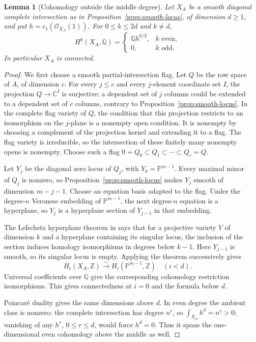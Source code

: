 \documentclass[11pt]{article}
\newcommand{\Q}{\mathbb Q}
\newcommand{\C}{\mathbb C}
\newcommand{\Z}{\mathbb Z}
\newcommand{\PP}{\mathbb P}
\theoremstyle{plain}
\newtheorem{lemma}[theorem]{Lemma}
\theoremstyle{definition}
\theoremstyle{remark}
\numberwithin{equation}{section}
\begin{document}
\begin{lemma}[Cohomology outside the middle degree]\label{lem:ambient}
Let \(X_A\) be a smooth diagonal complete intersection as in
Proposition~\ref{prop:smooth-locus}, of dimension \(d\geq1\),
and put \(h=c_1(\mathcal O_{X_A}(1))\).  For \(0\leq k\leq2d\)
and \(k\ne d\),
\[
 H^k(X_A,\Q)=
 \begin{cases}
 \Q h^{k/2},&k\text{ even},\\
 0,&k\text{ odd}.
 \end{cases}
\]
In particular \(X_A\) is connected.
\end{lemma}
\begin{proof}
We first choose a smooth partial-intersection flag.  Let \(Q\) be the
row space of \(A\), of dimension \(c\).  For every \(j\leq c\)
and every \(j\)-element coordinate set \(I\), the projection
\(Q\to\C^I\) is surjective: a dependent set of \(j\) columns
could be extended to a dependent set of \(c\) columns, contrary
to Proposition~\ref{prop:smooth-locus}.  In the complete flag
variety of \(Q\), the condition that this projection restricts
to an isomorphism on the \(j\)-plane is a nonempty open condition.
It is nonempty by choosing a complement of the projection kernel
and extending it to a flag.  The flag variety is irreducible, so
the intersection of these finitely many nonempty opens is nonempty.
Choose such a flag \(0=Q_0\subset Q_1\subset\cdots\subset Q_c=Q\).

Let \(Y_j\) be the diagonal zero locus of \(Q_j\), with
\(Y_0=\PP^{m-1}\).  Every maximal minor of \(Q_j\) is nonzero,
so Proposition~\ref{prop:smooth-locus} makes \(Y_j\) smooth of
dimension \(m-j-1\).  Choose an equation basis adapted to the
flag.  Under the degree-\(n\) Veronese embedding of \(\PP^{m-1}\),
the next degree-\(n\) equation is a hyperplane, so \(Y_j\) is a
hyperplane section of \(Y_{j-1}\) in that embedding.

The Lefschetz hyperplane theorem in
\cite[Corollary~7.3, p.~41]{Milnor} says that for a projective
variety \(V\) of dimension \(k\) and a hyperplane containing its
singular locus, the inclusion of the section induces homology
isomorphisms in degrees below \(k-1\).  Here \(Y_{j-1}\) is
smooth, so its singular locus is empty.  Applying the theorem
successively gives
\[
 H_i(X_A,\Z)\xrightarrow{\sim}H_i(\PP^{m-1},\Z)\quad(i<d).
\]
Universal coefficients over \(\Q\) give the corresponding
cohomology restriction isomorphisms.  This gives connectedness
at \(i=0\) and the formula below \(d\).

Poincar\'{e} duality gives the same dimensions above \(d\).
In even degree the ambient class is nonzero: the complete
intersection has degree \(n^c\), so \(\int_{X_A}h^d=n^c>0\);
vanishing of any \(h^r\), \(0\leq r\leq d\), would force
\(h^d=0\).  Thus it spans the one-dimensional even cohomology
above the middle as well.
\end{proof}
\end{document}
